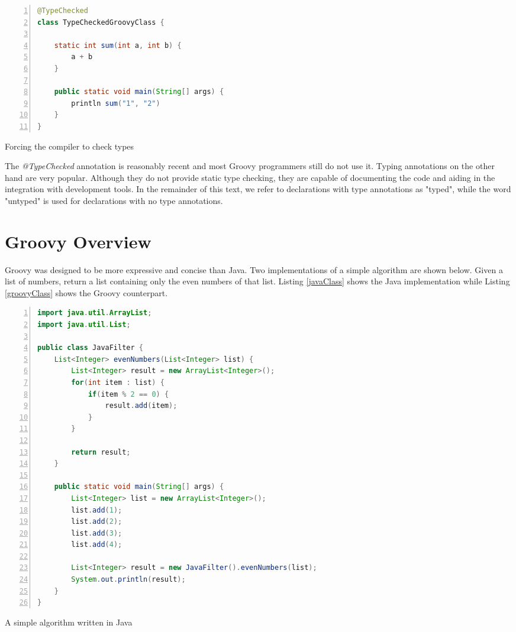 \documentclass[msc]{ppgccufmg}
\begin{document}
\begin{Listing}[ht]
\begin{lstlisting}[basicstyle=\ttfamily, language=Java,tabsize=2,breaklines=true,numbers=left]
@TypeChecked
class TypeCheckedGroovyClass {
	
	static int sum(int a, int b) {
		a + b
	}

	public static void main(String[] args) {
		println sum("1", "2")
	}
}
\end{lstlisting}
\caption{Forcing the compiler to check types}
\label{staticTyping}
\end{Listing}

The \emph{@TypeChecked} annotation is reasonably recent and most Groovy programmers still do not use it. 
Typing annotations on the other hand are very popular.
Although they do not provide static type checking, they are capable of documenting the code and aiding in the integration with development tools.
In the remainder of this text, we refer to declarations with type annotations as "typed", while the word "untyped" is used for declarations with no type annotations.


\section{Groovy Overview}
Groovy was designed to be more expressive and concise than Java.
Two implementations of a simple algorithm are shown below.
Given a list of numbers, return a list containing only the even numbers of that list.
Listing \ref{javaClass} shows the Java implementation while Listing \ref{groovyClass} shows the Groovy counterpart. 


\begin{Listing}[ht]
\begin{lstlisting}[basicstyle=\ttfamily, language=Java,tabsize=2,breaklines=true,numbers=left]
import java.util.ArrayList;
import java.util.List;

public class JavaFilter {
	List<Integer> evenNumbers(List<Integer> list) {
		List<Integer> result = new ArrayList<Integer>();
		for(int item : list) {
			if(item % 2 == 0) {
				result.add(item);
			}
		}

		return result;
	}

	public static void main(String[] args) {
		List<Integer> list = new ArrayList<Integer>();
		list.add(1);
		list.add(2);
		list.add(3);
		list.add(4);

		List<Integer> result = new JavaFilter().evenNumbers(list);
		System.out.println(result);
	}
}
\end{lstlisting}
\caption{A simple algorithm written in Java}
\label{javaClass}
\end{Listing}
\end{document}
